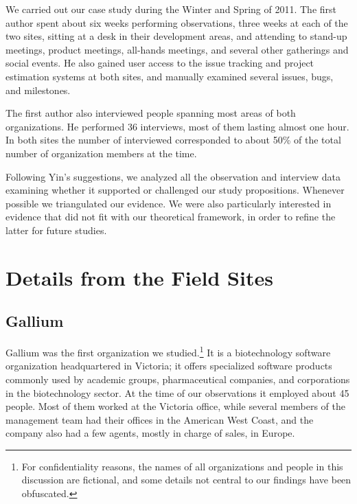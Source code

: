 \documentclass[10pt, conference, compsocconf]{IEEEtran}
\begin{document}
We carried out our case study during the Winter and Spring of 2011. The first author spent about six weeks performing observations, three weeks at each of the two sites, sitting at a desk in their development areas, and attending to stand-up meetings, product meetings, all-hands meetings, and several other gatherings and social events. He also gained user access to the issue tracking and project estimation systems at both sites, and manually examined several issues, bugs, and milestones.

The first author also interviewed people spanning most areas of both organizations. He performed 36 interviews, most of them lasting almost one hour. In both sites the number of interviewed corresponded to about 50\% of the total number of organization members at the time.

Following Yin's \cite{Yin2003} suggestions, we analyzed all the observation and interview data examining whether it supported or challenged our study propositions. Whenever possible we triangulated our evidence. We were also particularly interested in evidence that did not fit with our theoretical framework, in order to refine the latter for future studies.




\section{Details from the Field Sites}

\subsection{Gallium}

Gallium was the first organization we studied.\footnote{For confidentiality reasons, the names of all organizations and people in this discussion are fictional, and some details not central to our findings have been obfuscated.} It is a biotechnology software organization headquartered in Victoria; it offers specialized software products commonly used by academic groups, pharmaceutical companies, and corporations in the biotechnology sector. At the time of our observations it employed about 45 people. Most of them worked at the Victoria office, while several members of the management team had their offices in the American West Coast, and the company also had a few agents, mostly in charge of sales, in Europe.
\end{document}
